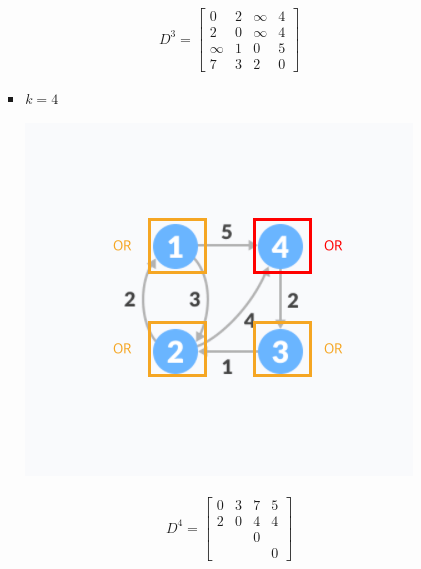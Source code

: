 \documentclass[12pt]{article}
\begin{document}
\begin{enumerate}[1.]
\begin{itemize}
\begin{itemize}
\begin{itemize}
                \begin{align}
                    D^3 = \begin{bmatrix}
                        0 & 2 & \infty & 4\\
                        2 & 0 & \infty & 4\\
                        \infty & 1 & 0 & 5\\
                        7 & 3 & 2 & 0
                    \end{bmatrix}
                \end{align}

                \item $k = 4$

                \begin{center}
                \includegraphics[width=0.5\linewidth]{images/worksheet_4_solution_51.png}
                \end{center}

                \begin{align}
                    D^4 = \begin{bmatrix}
                        0 & 3 & 7 & 5 \\
                        2 & 0 & 4 & 4 \\
                         &  & 0 & \\
                         &  &  & 0
                    \end{bmatrix}
                \end{align}
            \end{itemize}
        \end{itemize}

    \end{itemize}


\end{enumerate}
\end{document}
